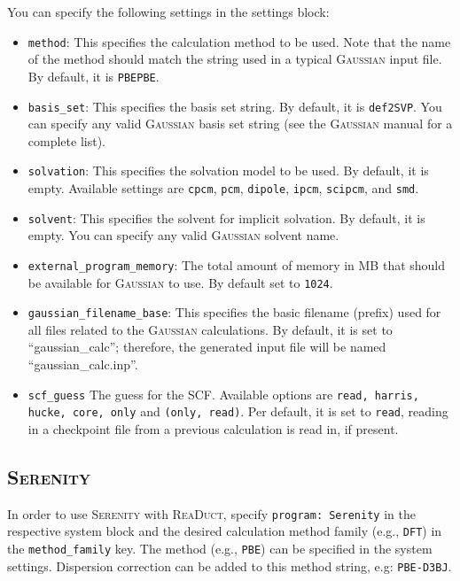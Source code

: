 \documentclass[]{tufte-book}
\begin{document}
You can specify the following settings in the settings block:
\begin{itemize}
\item \texttt{method}:
This specifies the calculation method to be used.
Note that the name of the method should match the string used in a typical \textsc{Gaussian} input file.
By default, it is \texttt{PBEPBE}.
\item \texttt{basis\_set}: This specifies the basis set string. By default, it is \texttt{def2SVP}. You can specify
any valid \textsc{Gaussian} basis set string (see the \textsc{Gaussian} manual for a complete list).
\item \texttt{solvation}: This specifies the solvation model to be used. By default, it is empty. Available settings are \texttt{cpcm}, \texttt{pcm}, \texttt{dipole}, \texttt{ipcm}, \texttt{scipcm},
and \texttt{smd}.
\item \texttt{solvent}: This specifies the solvent for implicit solvation. By default, it is empty. You can specify any valid \textsc{Gaussian} solvent name.
\item \texttt{external\_program\_memory}: The total amount of memory in MB that should be available for \textsc{Gaussian} to use.
By default set to \texttt{1024}.
\item \texttt{gaussian\_filename\_base}: This specifies the basic filename (prefix) used for all files related to the \textsc{Gaussian} calculations.
By default, it is set to ``gaussian\_calc''; therefore, the generated input file will be named ``gaussian\_calc.inp''.
\item \texttt{scf\_guess} The guess for the SCF. Available options are \texttt{read, harris, hucke, core, only} and \texttt{(only, read)}. Per default, it is set to \texttt{read}, reading in a checkpoint file from a previous calculation is read in, if present.
\end{itemize}


\subsection{\textsc{Serenity}}

In order to use \textsc{Serenity} with \textsc{ReaDuct}, specify \texttt{program: Serenity} in the respective system block and the desired
calculation method family (e.g., \texttt{DFT}) in the \texttt{method\_family} key.
The method (e.g., \texttt{PBE}) can be specified in the system settings. Dispersion correction can be added to this method string, e.g:
\texttt{PBE-D3BJ}.
\end{document}
